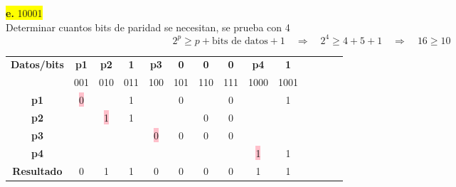 \documentclass{article}
\begin{document}
	\begin{center}
		\hspace{3cm}\colorbox{yellow}{{\textbf{e.} 10001}}\newline
		\\Determinar cuantos bits de paridad se necesitan, se prueba con 4
		\[
		2^p \geq p + \text{bits de datos} + 1
		\quad \Rightarrow \quad	2^4 \geq 4 + 5 + 1 \quad \Rightarrow \quad 16 \geq 10
		\]
		
		\begin{table}[h!]
			\centering
			\begin{tabular}{c|ccccccccccccc}
				\toprule
				\textbf{Datos/bits} & \textbf{p1} & \textbf{p2} & \textbf{1} & \textbf{p3} & \textbf{0} & \textbf{0} & \textbf{0} & \textbf{p4} & \textbf{1}\\ & \scriptsize001 & \scriptsize010 & \scriptsize011 & \scriptsize100 & \scriptsize101 & \scriptsize110 & \scriptsize111 & \scriptsize1000 & \scriptsize1001\\
				\midrule
				\textbf{p1} & \colorbox{pink}{0} & & 1 & & 0 & & 0 & & 1\\
				\midrule
				\textbf{p2} &  & \colorbox{pink}{1} & 1 & & & 0 & 0 & & \\
				\midrule
				\textbf{p3} & & & & \colorbox{pink}{0} & 0 & 0 & 0 & & \\
				\midrule
				\textbf{p4} & & & & & & & & \colorbox{pink}{1} & 1\\
				\midrule
				\midrule
				\textbf{Resultado} & 0 & 1 & 1 & 0 & 0 & 0 & 0 & 1 & 1\\
				\bottomrule
			\end{tabular}
		\end{table}
	\end{center}
	
\end{document}
